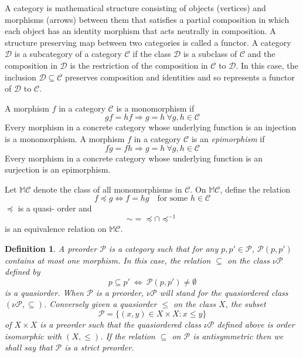 \documentclass{amsart}
\theoremstyle{plain}
\newtheorem{defn}{Definition}
\begin{document}
	A category is mathematical structure consisting of objects (vertices) and morphisms (arrows) between them that satisfies a partial composition in which each object has an identity morphism that acts neutrally in composition.
	A structure preserving map between two categories is called a functor.
	A category $\mathcal{D}$ is a subcategory of a category $\mathcal{C}$ if the class $\mathcal{D}$ is a subclass of $\mathcal{C}$ and the composition in $\mathcal{D}$ is the restriction of the composition in $\mathcal{C}$ to $\mathcal{D}$. In this case, the inclusion $\mathcal{D} \subseteq \mathcal{C}$ preserves composition and identities and so represents a functor of $\mathcal{D}$ to $\mathcal{C}$. 


A morphism $f$ in a category $\mathcal{C}$ is a monomorphism if 
$$ gf = hf \Rightarrow g = h \ \forall g,h \in \mathcal{C} $$
Every morphism in a concrete category whose underlying function is an injection is a monomorphism. A morphism $f$ in a category $\mathcal{C}$ is an \textit{epimorphism} if 
$$ fg = fh \Rightarrow g = h \ \forall g,h \in \mathcal{C} $$
Every morphism in a concrete category whose underlying function is an surjection is an epimorphism.


Let $\mathbb{M} \mathcal{C}$ denote the class of all monomorphisms in $\mathcal{C}$. On  $\mathbb{M} \mathcal{C}$, define the relation $$f \preceq g \Leftrightarrow f = hg \quad \text{for some } h \in \mathcal{C}$$
$\preceq$ is a quasi- order and  
\begin{equation}
	\sim = \preceq \cap \preceq^{-1}
\end{equation} is an equivalence relation on $\mathbb{M} \mathcal{C}$.

\begin{defn}
	A preorder $\mathcal{P}$ is a category such that for any $p, p' \in  \mathcal{P}$, $\mathcal{P}(p,p')$ contains at most one morphism. In this case, the relation $\subseteq$ on the class $\nu \mathcal{P}$ defined by 
	\begin{equation}
		p \subseteq p' \ \Leftrightarrow \ \mathcal{P}(p,p') \neq \emptyset
	\end{equation}
	is a quasiorder. When $\mathcal{P}$ is a preorder, $\nu \mathcal{P}$ will stand for the quasiordered class $(\nu \mathcal{P}, \subseteq)$. Conversely given a quasiorder $\leq$ on the class $X$, the subset $$ \mathcal{P} = \{(x,y) \in X \times X : x \leq y\}$$
	of $ X \times X $ is a preorder such that the quasiordered class $\nu \mathcal{P}$ defined above is order isomorphic with $(X,\leq)$. If the relation $\subseteq$ on $\mathcal{P}$  is antisymmetric then we shall say that $\mathcal{P}$ is a \textit{strict preorder}.
\end{defn}
\end{document}
